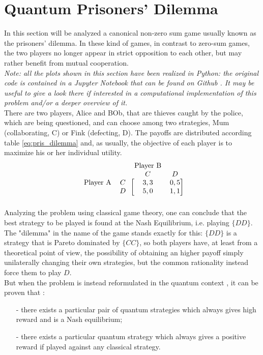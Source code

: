 \hfill

\section{Quantum Prisoners' Dilemma}
In this section will be analyzed a canonical non-zero sum game usually known as the prisoners' dilemma. In these kind of games, in contrast to zero-sum games, the two players no longer appear in strict opposition to each other, but may rather benefit from mutual cooperation. \\
\textit{
Note: all the plots shown in this section have been realized in Python: the original code is contained in a Jupyter Notebook that can be found on Github \cite{Pujatti_github}. It may be useful to give a look there if interested in a computational implementation of this problem and/or a deeper overview of it.}\\
There are two players, Alice and BOb, that are thieves caught by the police, which are being questioned, and can choose among two strategies, Mum (collaborating, C) or Fink (defecting, D). The payoffs are distributed according table \ref{eq:pris_dilemma} and, as usually, the objective of each player is to maximize his or her individual utility.
\begin{equation}
\begin{blockarray}{cccc}
& & \text{Player B}&\\
& & C & D\\
\begin{block}{cc[cc]}
\text{Player A} & C & 3,3 &  0,5 \\
 & D & 5,0 & 1,1 \\
\end{block}
\end{blockarray}
\label{eq:pris_dilemma}
\end{equation}
Analyzing the problem using classical game theory, one can conclude that the best strategy to be played is found at the Nash Equilibrium, i.e. playing $\{DD\}$. The "dilemma" in the name of the game stands exactly for this: $\{DD\}$ is a strategy that is Pareto dominated by $\{CC\}$, so both players have, at least from a theoretical point of view, the possibility of obtaining an higher payoff simply unilaterally changing their own strategies, but the common rationality instead force them to play $D$.\\
But when the problem is instead reformulated in the quantum context \cite{Eisert_2020}, it can be proven that :
\begin{itemize}[noitemsep]
	\item[-] there exists
a particular pair of quantum strategies which always gives high reward and is a Nash equilibrium;
	\item[-] there exists a particular quantum strategy which always gives a positive reward if played
against any classical strategy.
\end{itemize}
